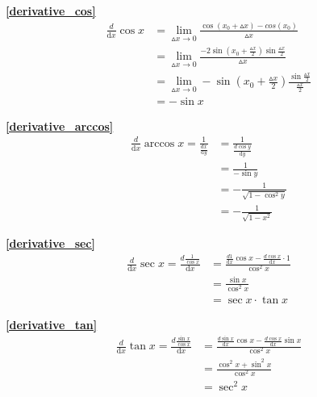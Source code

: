 \textbf{\large \ref{derivative_cos}}
\begin{displaymath}
    \begin{split}
        \frac{d}{\mathrm{d}{x}}\cos x&=\lim\limits_{\vartriangle x\to 0}\frac{\cos(x_0+\vartriangle x)-cos(x_0)}{\vartriangle x}\\
        &=\lim\limits_{\vartriangle x\to 0}\frac{-2\sin \left(x_0+\frac{\vartriangle x}{2}\right)\sin\frac{\vartriangle x}{2}}{\vartriangle x}\\
        &=\lim\limits_{\vartriangle x\to 0}-\sin \left(x_0+\frac{\vartriangle x}{2}\right)\frac{\sin\frac{\vartriangle x}{2}}{\frac{\vartriangle x}{2}}\\
        &=-\sin x
    \end{split}
\end{displaymath}

\textbf{\large \ref{derivative_arccos}}
\begin{displaymath}
    \begin{split}
        \frac{d}{\mathrm{d}{x}}\arccos x=\frac{1}{\frac{dx}{\mathrm{d}{y}}}&=\frac{1}{\frac{d\cos y}{\mathrm{d}{y}}}\\
        &=\frac{1}{-\sin y}\\
        &=-\frac{1}{\sqrt{1-\cos^2 y}}\\
        &=-\frac{1}{\sqrt{1-x^2}}
    \end{split}
\end{displaymath}

\textbf{\large \ref{derivative_sec}}
\begin{displaymath}
    \begin{split}
        \frac{d}{\mathrm{d}{x}}\sec x=\frac{d\frac{1}{\cos x}}{\mathrm{d}{x}}&=\frac{\frac{d 1}{\mathrm{d}{x}}\cos x-\frac{d\cos x}{\mathrm{d}{x}}\cdot 1}{\cos^2x}\\
        &=\frac{\sin x}{\cos^2x}\\
        &=\sec x\cdot\tan x
    \end{split}
\end{displaymath}

\textbf{\large \ref{derivative_tan}}
\begin{displaymath}
    \begin{split}
        \frac{d}{\mathrm{d}{x}}\tan x=\frac{d\frac{\sin x}{\cos x}}{\mathrm{d}{x}}&=\frac{\frac{d\sin x}{\mathrm{d}{x}}\cos x-\frac{d\cos x}{\mathrm{d}{x}}\sin x}{\cos^2x}\\
        &=\frac{\cos^2 x+\sin^2 x}{\cos^2x}\\
        &=\sec^2 x
    \end{split}
\end{displaymath}

